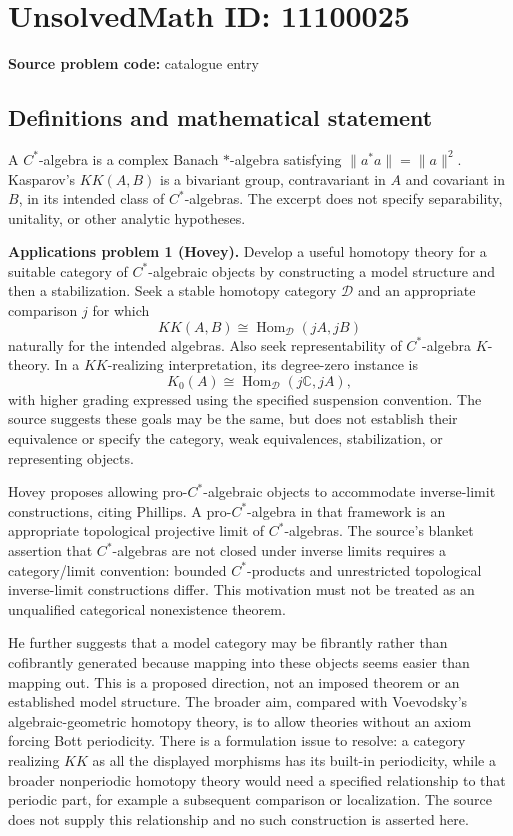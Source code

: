 \documentclass[11pt]{article}
\newcommand{\C}{\mathbb{C}}
\begin{document}
\section*{UnsolvedMath ID: 11100025}
\textbf{Source problem code:} catalogue entry
\subsection{Definitions and mathematical statement}
A $C^*$-algebra is a complex Banach $*$-algebra satisfying $\|a^*a\|=\|a\|^2$. Kasparov's $KK(A,B)$ is a bivariant group, contravariant in $A$ and covariant in $B$, in its intended class of $C^*$-algebras. The excerpt does not specify separability, unitality, or other analytic hypotheses.

\textbf{Applications problem 1 (Hovey).} Develop a useful homotopy theory for a suitable category of $C^*$-algebraic objects by constructing a model structure and then a stabilization. Seek a stable homotopy category $\mathcal D$ and an appropriate comparison $j$ for which
\[
 KK(A,B)\cong\operatorname{Hom}_{\mathcal D}(jA,jB)
\]
naturally for the intended algebras. Also seek representability of $C^*$-algebra $K$-theory. In a $KK$-realizing interpretation, its degree-zero instance is
\[
 K_0(A)\cong\operatorname{Hom}_{\mathcal D}(j\C,jA),
\]
with higher grading expressed using the specified suspension convention. The source suggests these goals may be the same, but does not establish their equivalence or specify the category, weak equivalences, stabilization, or representing objects.

Hovey proposes allowing pro-$C^*$-algebraic objects to accommodate inverse-limit constructions, citing Phillips. A pro-$C^*$-algebra in that framework is an appropriate topological projective limit of $C^*$-algebras. The source's blanket assertion that $C^*$-algebras are not closed under inverse limits requires a category/limit convention: bounded $C^*$-products and unrestricted topological inverse-limit constructions differ. This motivation must not be treated as an unqualified categorical nonexistence theorem.

He further suggests that a model category may be fibrantly rather than cofibrantly generated because mapping into these objects seems easier than mapping out. This is a proposed direction, not an imposed theorem or an established model structure. The broader aim, compared with Voevodsky's algebraic-geometric homotopy theory, is to allow theories without an axiom forcing Bott periodicity. There is a formulation issue to resolve: a category realizing $KK$ as all the displayed morphisms has its built-in periodicity, while a broader nonperiodic homotopy theory would need a specified relationship to that periodic part, for example a subsequent comparison or localization. The source does not supply this relationship and no such construction is asserted here.
\end{document}
